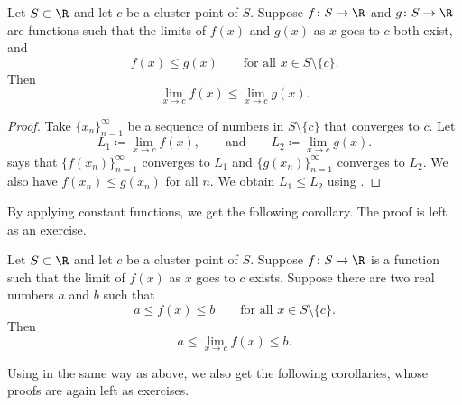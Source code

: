 \begin{cor}
Let $S \subset \R$ and let $c$ be a cluster point of $S$.  
Suppose $f \colon S \to
\R$ and $g \colon S \to \R$ are functions
such that
the limits of $f(x)$ and $g(x)$ as $x$ goes to $c$ both exist,
and
\begin{equation*}
f(x) \leq g(x) \qquad \text{for all } x \in S \setminus \{ c \}.
\end{equation*}
Then
\begin{equation*}
\lim_{x\to c} f(x) \leq \lim_{x\to c} g(x) .
\end{equation*}
\end{cor}

\begin{proof}
Take $\{ x_n \}_{n=1}^\infty$ be a sequence of numbers in $S \setminus \{ c \}$
that converges to $c$.  Let
\begin{equation*}
L_1 \coloneqq \lim_{x\to c} f(x), \qquad \text{and} \qquad L_2 \coloneqq \lim_{x\to c} g(x) .
\end{equation*}
 says that $\bigl\{ f(x_n) \bigr\}_{n=1}^\infty$ converges to
$L_1$ and $\bigl\{ g(x_n) \bigr\}_{n=1}^\infty$ converges to $L_2$.  We also
have $f(x_n) \leq g(x_n)$ for all $n$.
We obtain $L_1 \leq L_2$ using
.
\end{proof}

By applying constant functions, we get the following corollary.  The
proof is left as an exercise.

\begin{cor} \label{fconstineq:cor}
Let $S \subset \R$ and let $c$ be a cluster point of $S$.  Suppose $f \colon S \to
\R$ is a function such that the limit of $f(x)$ as $x$ goes to $c$
exists.
Suppose there are two real numbers $a$ and $b$ such that
\begin{equation*}
a \leq f(x) \leq b \qquad \text{for all } x \in S \setminus \{ c \}.
\end{equation*}
Then
\begin{equation*}
a \leq \lim_{x\to c} f(x) \leq b .
\end{equation*}
\end{cor}

Using  in the same way as above, we also get
the following corollaries, whose proofs are again left as exercises.

